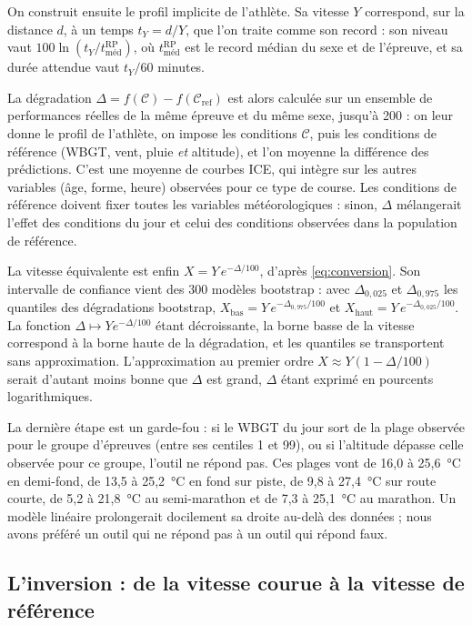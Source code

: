 \documentclass[11pt,a4paper]{article}
\newcommand{\RP}{\mathrm{RP}}
\begin{document}
On construit ensuite le profil implicite de l'athlète. Sa vitesse $Y$ correspond, sur la distance $d$, à un temps
$t_Y = d/Y$, que l'on traite comme son record : son niveau vaut $100\ln(t_Y/t^{\RP}_{\text{méd}})$, où
$t^{\RP}_{\text{méd}}$ est le record médian du sexe et de l'épreuve, et sa durée attendue vaut $t_Y/60$ minutes.

La dégradation $\Delta = f(\mathcal{C}) - f(\mathcal{C}_{\text{ref}})$ est alors calculée sur un ensemble de
performances réelles de la même épreuve et du même sexe, jusqu'à 200 : on leur donne le profil de l'athlète, on impose
les conditions $\mathcal{C}$, puis les conditions de référence (WBGT, vent, pluie \emph{et} altitude), et l'on moyenne
la différence des prédictions. C'est une moyenne de courbes ICE, qui intègre sur les autres variables (âge, forme,
heure) observées pour ce type de course. Les conditions de référence doivent fixer toutes les variables
météorologiques : sinon, $\Delta$ mélangerait l'effet des conditions du jour et celui des conditions observées dans
la population de référence.

La vitesse équivalente est enfin $X = Y\,e^{-\Delta/100}$, d'après \eqref{eq:conversion}. Son intervalle de confiance
vient des 300 modèles bootstrap : avec $\Delta_{0{,}025}$ et $\Delta_{0{,}975}$ les quantiles des dégradations
bootstrap, $X_{\text{bas}} = Y\,e^{-\Delta_{0{,}975}/100}$ et $X_{\text{haut}} = Y\,e^{-\Delta_{0{,}025}/100}$. La
fonction $\Delta \mapsto Y e^{-\Delta/100}$ étant décroissante, la borne basse de la vitesse correspond à la borne haute
de la dégradation, et les quantiles se transportent sans approximation. L'approximation au premier ordre
$X \approx Y(1 - \Delta/100)$ serait d'autant moins bonne que $\Delta$ est grand, $\Delta$ étant exprimé en pourcents
logarithmiques.

La dernière étape est un garde-fou : si le WBGT du jour sort de la plage observée pour le groupe d'épreuves (entre ses
centiles 1 et 99), ou si l'altitude dépasse celle observée pour ce groupe, l'outil ne répond pas. Ces plages vont de
16,0 à 25,6~°C en demi-fond, de 13,5 à 25,2~°C en fond sur piste, de 9,8 à 27,4~°C sur route courte, de 5,2 à 21,8~°C
au semi-marathon et de 7,3 à 25,1~°C au marathon. Un modèle linéaire prolongerait docilement sa droite au-delà des
données ; nous avons préféré un outil qui ne répond pas à un outil qui répond faux.

\subsection{L'inversion : de la vitesse courue à la vitesse de référence}\label{sec:inversion}
\end{document}
